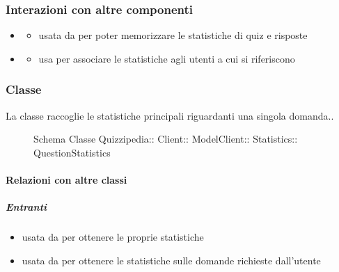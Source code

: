 \subsubsection{Interazioni con altre componenti}
\begin{itemize}
\item {}
\begin{itemize}
\item usata da  per poter memorizzare le statistiche di quiz e risposte
\end{itemize}
\item {}
\begin{itemize}
\item usa  per associare le statistiche agli utenti a cui si riferiscono
\end{itemize}
\end{itemize}
\subsubsection{Classe }
La classe raccoglie le statistiche principali riguardanti una singola domanda..
\begin{figure}[H]
\centering
\noindent{}
\caption[Schema Classe QuestionStatistics]{Schema Classe Quizzipedia:: Client:: ModelClient:: Statistics:: QuestionStatistics}
\end{figure}
\paragraph{Relazioni con altre classi}
\subparagraph{Entranti}
\begin{itemize}
\item usata da  per ottenere le proprie statistiche
\item usata da  per ottenere le statistiche sulle domande richieste dall'utente
\end{itemize}
